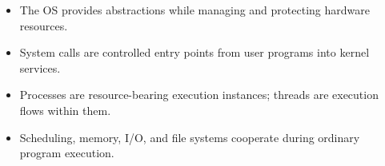 \begin{chapterrecap}
\begin{itemize}
  \item The OS provides abstractions while managing and protecting hardware resources.
  \item System calls are controlled entry points from user programs into kernel services.
  \item Processes are resource-bearing execution instances; threads are execution flows within them.
  \item Scheduling, memory, I/O, and file systems cooperate during ordinary program execution.
\end{itemize}
\end{chapterrecap}
